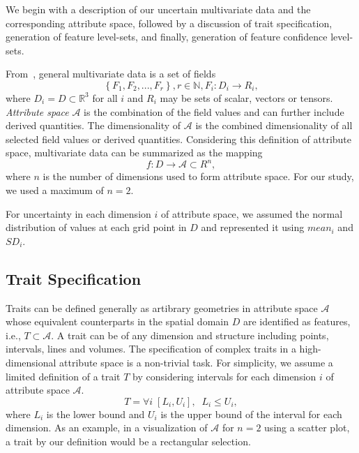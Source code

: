 


We begin with a description of our uncertain multivariate data and the corresponding attribute space, followed by a discussion of trait specification, generation of feature level-sets, and finally, generation of feature confidence level-sets.

%
From~\cite{jankowai2020feature}, general multivariate data is a set of fields
\begin{equation}
\left\{F_{1},F_{2},...,F_{r}\right\}, r\in\mathbb{N}, F_{i}:D_{i} \to R_{i},
\end{equation}
where $D_{i} = D \subset \mathbb{R}^{3}$ for all $i$ and $R_{i}$ may be sets of scalar, vectors or tensors.
%
\textit{Attribute space} $\mathcal{A}$ is the combination of the field values and can further include derived quantities.
%
The dimensionality of $\mathcal{A}$ is the combined dimensionality of all selected field values or derived quantities.
%
Considering this definition of attribute space, multivariate data can be summarized as the mapping
\begin{equation}
f : D \to \mathcal{A} \subset R^{n},
\end{equation}
%
where $n$ is the number of dimensions used to form attribute space. 
%
For our study, we used a maximum of $n = 2$. 
%

For uncertainty in each dimension $i$ of attribute space, we assumed the normal distribution of values at each grid point in $D$ and represented it using $mean_{i}$ and $SD_{i}$. 

\subsection{Trait Specification}
Traits can be defined generally as artibrary geometries in attribute space $\mathcal{A}$ whose equivalent counterparts in the spatial domain $D$ are identified as features, i.e., $T\subset\mathcal{A}$.
%
A trait can be of any dimension and structure including points, intervals, lines and volumes.
%
The specification of complex traits in a high-dimensional attribute space is a non-trivial task.
%
For simplicity, we assume a limited definition of a trait $T$ by considering intervals for each dimension $i$ of attribute space $\mathcal{A}$.
%
\begin{equation}	
T = \forall{i}\;[L_{i}, U_{i}], \;\;L_{i} \leqslant U_{i}, 
\end{equation}
where $L_{i}$ is the lower bound and $U_{i}$ is the upper bound of the interval for each dimension.
%
As an example, in a visualization of $\mathcal{A}$ for $n = 2$ using a scatter plot, a trait by our definition would be a rectangular selection.

